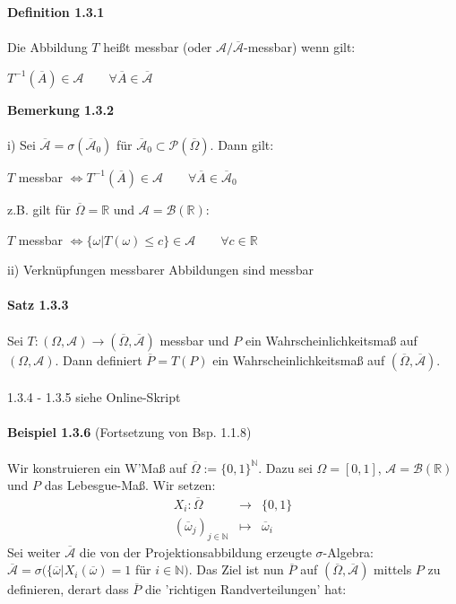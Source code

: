 \documentclass[10pt,a4paper]{report}
\numberwithin{equation}{section}
\numberwithin{figure}{section}
\theoremstyle{plain}
\theoremstyle{definition}
\theoremstyle{plain}
\theoremstyle{definition}
\theoremstyle{remark}
\theoremstyle{plain}
\theoremstyle{plain}
\theoremstyle{plain}
\newcommand{\1}{ \mathbb{1} } %
\begin{document}
\textbf{Definition 1.3.1}\\\\
Die Abbildung $T$ heißt messbar (oder $\mathcal{A}/\overline{\mathcal{A}}$-messbar) wenn gilt:
\begin{center}
$T^{-1}(\overline{A}) \in \mathcal{A} \qquad \forall \overline{A} \in \overline{\mathcal{A}}$
\end{center}
\textbf{Bemerkung 1.3.2}\\\\
i) Sei $\overline{\mathcal{A}}=\sigma(\overline{\mathcal{A}}_0)$ für $\overline{\mathcal{A}}_0 \subset \mathcal{P}(\overline{\Omega})$. Dann gilt:
\begin{center}
$T$ messbar $\Leftrightarrow T^{-1}(\overline{A}) \in \mathcal{A} \qquad \forall \overline{A} \in \overline{\mathcal{A}}_0$ 
\end{center}
z.B. gilt für $\overline{\Omega}=\mathbb{R}$ und $\mathcal{A}=\mathcal{B}(\mathbb{R})$:
\begin{center}
$T$ messbar $\Leftrightarrow \{\omega|T(\omega)\leq c\} \in \mathcal{A} \qquad \forall c \in \mathbb{R}$
\end{center}
ii) Verknüpfungen messbarer Abbildungen sind messbar\\\\
\textbf{Satz 1.3.3}\\\\
Sei $T:(\Omega, \mathcal{A})\to(\overline{\Omega},\overline{\mathcal{A}})$ messbar und $P$ ein Wahrscheinlichkeitsmaß auf $(\Omega, \mathcal{A})$. Dann definiert $\overline{P}=T(P)$ ein Wahrscheinlichkeitsmaß auf $(\overline{\Omega},\overline{\mathcal{A}})$.\\\\
1.3.4 - 1.3.5 siehe Online-Skript\\\\
\textbf{Beispiel 1.3.6} (Fortsetzung von Bsp. 1.1.8)\\\\
Wir konstruieren ein W'Maß auf $\overline{\Omega}:=\{0,1\}^\mathbb{N}$. Dazu sei $\Omega=[0,1]$, $\mathcal{A}=\mathcal{B}(\mathbb{R})$ und $P$ das Lebesgue-Maß. Wir setzen:
\begin{eqnarray*}
X_i:\overline{\Omega} &\to & \{0,1\}\\
(\overline{\omega}_j)_{j \in \mathbb{N}} &\mapsto & \overline{\omega}_i
\end{eqnarray*}
Sei weiter $\overline{\mathcal{A}}$ die von der Projektionsabbildung erzeugte $\sigma$-Algebra: $\overline{\mathcal{A}}=\sigma(\{\overline{\omega}|X_i(\overline{\omega})=1$ für $i\in \mathbb{N})$. Das Ziel ist nun $\overline{P}$ auf $(\overline{\Omega},\overline{\mathcal{A}})$ mittels $P$ zu definieren, derart dass $\overline{P}$ die 'richtigen Randverteilungen' hat:
\end{document}
